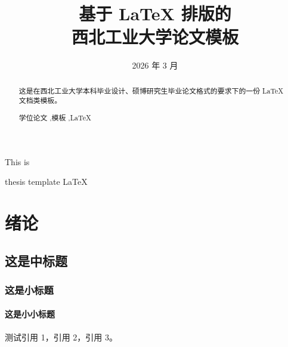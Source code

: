 \documentclass[degree=master, academic=true, blindreview=false]{nwputhesis}
\title{基于 LaTeX 排版的 \\ 西北工业大学论文模板}{          %
    Yet Another Thesis Template of \\ Northwestern Polytechnical University
}
\author{\blindreview{航小天}}{\blindreview{Xiaotian Hang}}  %
\date{2026 年 3 月}{March/2026}                             %
\begin{document}
\frontmatter                                                  %
\maketitle                                                    %


\begin{abstract}
    这是在西北工业大学本科毕业设计、硕博研究生毕业论文格式的要求下的一份 LaTeX
    文档类模板。
    \begin{keywords}
        学位论文 \sep 模板 \sep \LaTeX
    \end{keywords}
\end{abstract}

\begin{engabstract}
    This is
    \begin{engkeywords}
        thesis \ensep template \ensep \LaTeX
    \end{engkeywords}
\end{engabstract}

\tableofcontents                                              %

\mainmatter
\sDefault

\chapter{绪论}
\section{这是中标题}
\subsection{这是小标题}
\subsubsection{这是小小标题}
测试引用 1\cite{NWPUThesisLaTeXTemplate}，引用 2\cite{chen2014maiyuan,knuth1986the}，引用 3\cite{MathSymbolsinLaTeXbypolossk,shen2021peridynamic,chen2018autonomous}。
\end{document}

